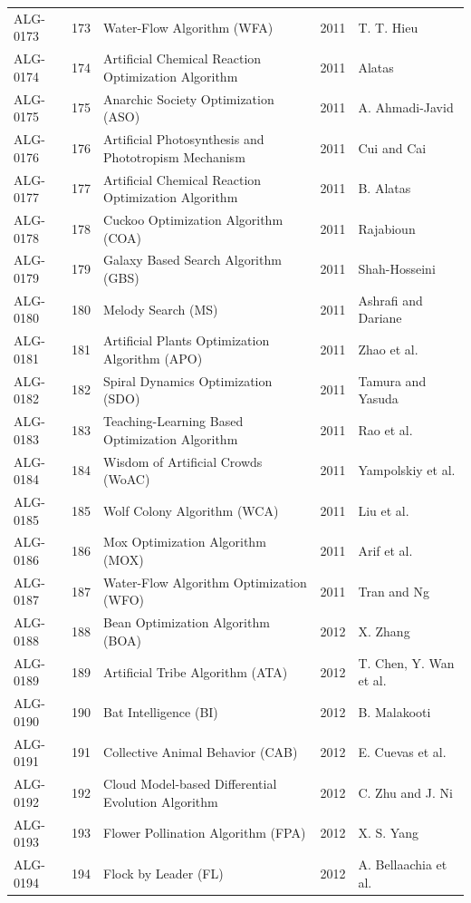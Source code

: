 \documentclass[8pt]{article}
\begin{document}
\begin{landscape}
\begin{longtable}{P{1.7cm}rP{10.0cm}rP{7.2cm}}
ALG-0173 & 173 & Water-Flow Algorithm (WFA) & 2011 & T. T. Hieu \\
ALG-0174 & 174 & Artificial Chemical Reaction Optimization Algorithm & 2011 & Alatas \\
ALG-0175 & 175 & Anarchic Society Optimization (ASO) & 2011 & A. Ahmadi-Javid \\
ALG-0176 & 176 & Artificial Photosynthesis and Phototropism Mechanism & 2011 & Cui and Cai \\
ALG-0177 & 177 & Artificial Chemical Reaction Optimization Algorithm & 2011 & B. Alatas \\
ALG-0178 & 178 & Cuckoo Optimization Algorithm (COA) & 2011 & Rajabioun \\
ALG-0179 & 179 & Galaxy Based Search Algorithm (GBS) & 2011 & Shah-Hosseini \\
ALG-0180 & 180 & Melody Search (MS) & 2011 & Ashrafi and Dariane \\
ALG-0181 & 181 & Artificial Plants Optimization Algorithm (APO) & 2011 & Zhao et al. \\
ALG-0182 & 182 & Spiral Dynamics Optimization (SDO) & 2011 & Tamura and Yasuda \\
ALG-0183 & 183 & Teaching-Learning Based Optimization Algorithm & 2011 & Rao et al. \\
ALG-0184 & 184 & Wisdom of Artificial Crowds (WoAC) & 2011 & Yampolskiy et al. \\
ALG-0185 & 185 & Wolf Colony Algorithm (WCA) & 2011 & Liu et al. \\
ALG-0186 & 186 & Mox Optimization Algorithm (MOX) & 2011 & Arif et al. \\
ALG-0187 & 187 & Water-Flow Algorithm Optimization (WFO) & 2011 & Tran and Ng \\
ALG-0188 & 188 & Bean Optimization Algorithm (BOA) & 2012 & X. Zhang \\
ALG-0189 & 189 & Artificial Tribe Algorithm (ATA) & 2012 & T. Chen, Y. Wan et al. \\
ALG-0190 & 190 & Bat Intelligence (BI) & 2012 & B. Malakooti \\
ALG-0191 & 191 & Collective Animal Behavior (CAB) & 2012 & E. Cuevas et al. \\
ALG-0192 & 192 & Cloud Model-based Differential Evolution Algorithm & 2012 & C. Zhu and J. Ni \\
ALG-0193 & 193 & Flower Pollination Algorithm (FPA) & 2012 & X. S. Yang \\
ALG-0194 & 194 & Flock by Leader (FL) & 2012 & A. Bellaachia et al. \\

\end{longtable}
\end{landscape}
\end{document}
